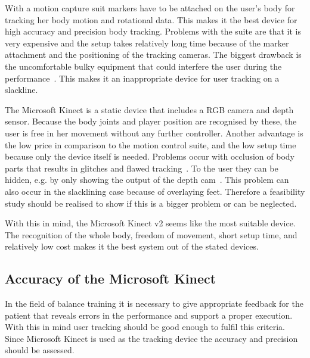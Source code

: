 With a motion capture suit markers have to be attached on the user’s body for tracking her body motion and rotational data. This makes it the best device for high accuracy and precision body tracking. Problems with the suite are that it is very expensive and the setup takes relatively long time because of the marker attachment and the positioning of the tracking cameras. The biggest drawback is the uncomfortable bulky equipment that could interfere the user during the performance~\cite{Bogdanovych2015-ci, Chang2012-hz, Nusman2006-rf}. This makes it an inappropriate device for user tracking on a slackline.

The Microsoft Kinect is a static device that includes a RGB camera and depth sensor. Because the body joints and player position are recognised by these, the user is free in her movement without any further controller. Another advantage is the low price in comparison to the motion control suite, and the low setup time because only the device itself is needed. Problems occur with occlusion of body parts that results in glitches and flawed tracking~\cite{Kajastila2014-ug, Tang2015-wt}. To the user they can be hidden, e.g. by only showing the output of the depth cam~\cite{Holsti2013-kn}. This problem can also occur in the slacklining case because of overlaying feet. Therefore a feasibility study should be realised to show if this is a bigger problem or can be neglected. 

With this in mind, the Microsoft Kinect v2 seems like the most suitable device. The recognition of the whole body, freedom of movement, short setup time, and relatively low cost makes it the best system out of the stated devices.

\subsection{Accuracy of the Microsoft Kinect}

In the field of balance training it is necessary to give appropriate feedback for the patient that reveals errors in the performance and support a proper execution. With this in mind user tracking should be good enough to fulfil this criteria. Since Microsoft Kinect is used as the tracking device the accuracy and precision should be assessed.

